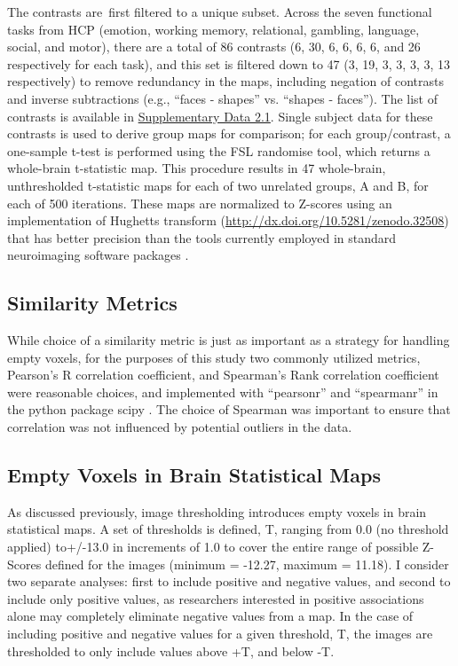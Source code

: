 \documentclass{report}
\begin{document}
The contrasts are~first filtered to a unique subset. Across the seven
functional tasks from HCP (emotion, working memory, relational,
gambling, language, social, and motor), there are a total of 86
contrasts (6, 30, 6, 6, 6, 6, and 26 respectively for each task), and
this set is filtered down to 47 (3, 19, 3, 3, 3, 3, 13 respectively) to
remove redundancy in the maps, including negation of contrasts and
inverse subtractions (e.g., ``faces - shapes'' vs. ``shapes - faces'').
The list of contrasts is available in \href{https://github.com/vsoch/thesis/blob/master/supplementary/chapter2/supp_data1_hcp_contrasts_id_filter.csv}{Supplementary Data 2.1}. Single
subject data for these contrasts is used to derive group maps for
comparison; for each group/contrast, a one-sample t-test is performed
using the FSL randomise tool, which returns a whole-brain t-statistic
map. This procedure results in 47 whole-brain, unthresholded t-statistic
maps for each of two unrelated groups, A and B, for each of 500
iterations. These maps are normalized to Z-scores using an
implementation of Hughetts transform
(\href{http://dx.doi.org/10.5281/zenodo.32508}{http://dx.doi.org/10.5281/zenodo.32508}) that has better precision than
the tools currently employed in standard neuroimaging software packages \cite{Hughett2007-ml}.

\subsection{Similarity Metrics}

While choice of a similarity metric is just as important as a strategy
for handling empty voxels, for the purposes of this study two commonly
utilized metrics, Pearson's R correlation coefficient, and Spearman's
Rank correlation coefficient \cite{Taylor1895-sv} were reasonable choices, and
implemented with ``pearsonr'' and ``spearmanr'' in the python package
scipy \cite{Jones2014-ut}. The choice of Spearman was important to ensure that correlation was not influenced by potential outliers in the data.

\subsection{Empty Voxels in Brain Statistical Maps}

As discussed previously, image thresholding introduces empty voxels in
brain statistical maps. A set of thresholds is defined, T, ranging from
0.0 (no threshold applied) to+/-13.0 in increments of 1.0 to cover the
entire range of possible Z-Scores defined for the images (minimum = -12.27, maximum = 11.18). I consider two separate analyses: first to
include positive and negative values, and second to include only
positive values, as researchers interested in positive associations
alone may completely eliminate negative values from a map. In the case
of including positive and negative values for a given threshold, T, the
images are thresholded to only include values above +T, and below -T.
\end{document}
